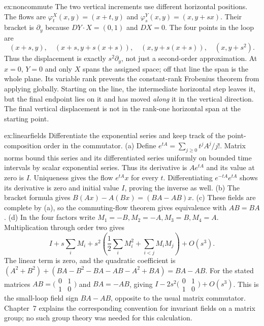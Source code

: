\begin{solution}{ex:noncommute}
\idea The two vertical increments use different horizontal positions.
\writeup The flows are $\varphi^X_t(x,y)=(x+t,y)$ and $\varphi^Y_s(x,y)=(x,y+sx)$. Their bracket is $\partial_y$ because $DY\cdot X=(0,1)$ and $DX=0$. The four points in the loop are
\[
(x+s,y),\quad(x+s,y+s(x+s)),\quad(x,y+s(x+s)),\quad(x,y+s^2).
\]
Thus the displacement is exactly $s^2\partial_y$, not just a second-order approximation. At $x=0$, $Y=0$ and only $X$ spans the assigned space; off that line the span is the whole plane. Its variable rank prevents the constant-rank Frobenius theorem from applying globally. Starting on the line, the intermediate horizontal step leaves it, but the final endpoint lies on it and has moved \emph{along} it in the vertical direction. The final vertical displacement is not in the rank-one horizontal span at the starting point.
\end{solution}

\begin{solution}{ex:linearfields}
\idea Differentiate the exponential series and keep track of the point-composition order in the commutator.
\writeup (a) Define $e^{tA}=\sum_{j\ge0}t^jA^j/j!$. Matrix norms bound this series and its differentiated series uniformly on bounded time intervals by scalar exponential series. Thus its derivative is $Ae^{tA}$ and its value at zero is $I$. Uniqueness gives the flow $e^{tA}x$ for every $t$. Differentiating $e^{-tA}e^{tA}$ shows its derivative is zero and initial value $I$, proving the inverse as well.
(b) The bracket formula gives $B(Ax)-A(Bx)=(BA-AB)x$.
(c) These fields are complete by (a), so the commuting-flow theorem gives equivalence with $AB=BA$.
(d) In the four factors write $M_1=-B,M_2=-A,M_3=B,M_4=A$. Multiplication through order two gives
\[
I+s\sum_iM_i+s^2\left(\frac12\sum_iM_i^2+\sum_{i<j}M_iM_j\right)+O(s^3).
\]
The linear term is zero, and the quadratic coefficient is
$(A^2+B^2)+(BA-B^2-BA-AB-A^2+BA)=BA-AB$.
For the stated matrices $AB=\bigl(\begin{smallmatrix}0&1\\1&0\end{smallmatrix}\bigr)$ and $BA=-AB$, giving
$I-2s^2\bigl(\begin{smallmatrix}0&1\\1&0\end{smallmatrix}\bigr)+O(s^3)$.
This is the small-loop field sign $BA-AB$, opposite to the usual matrix commutator. Chapter~7 explains the corresponding convention for invariant fields on a matrix group; no such group theory was needed for this calculation.
\end{solution}

